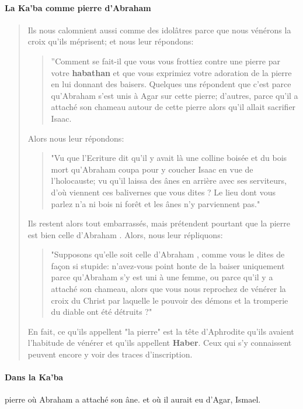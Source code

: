 \paragraph{La Ka'ba comme pierre d'Abraham}
\begin{quote}
    
Ils nous calomnient aussi comme des idolâtres parce que nous vénérons la croix qu'ils méprisent; et nous leur répondons: \begin{quote}
    ''Comment se fait-il que vous vous frottiez contre une pierre par votre \textbf{habathan} et que vous exprimiez votre adoration de la pierre en lui donnant des baisers. Quelques uns répondent que c'est parce qu'Abraham s'est unis à Agar sur cette pierre; d'autres, parce qu'il a attaché son chameau autour de cette pierre alors qu'il allait sacrifier Isaac.
\end{quote} Alors nous leur répondons: 
\begin{quote}
    "Vu que l'Ecriture dit qu'il y avait là une colline boisée et du bois mort qu'Abraham coupa pour y coucher Isaac en vue de l'holocauste; vu qu'il laissa des ânes en arrière avec ses serviteurs, d'où viennent ces balivernes que vous dites ? Le lieu dont vous parlez n'a ni bois ni forêt et les ânes n'y parviennent pas." 
\end{quote}

Ils restent alors tout embarrassés, mais prétendent pourtant que la pierre est bien celle d'Abraham . Alors, nous leur répliquons: \begin{quote}
    "Supposons qu'elle soit celle d'Abraham , comme vous le dites de façon si stupide: n'avez-vous point honte de la baiser uniquement parce qu'Abraham s'y est uni à une femme, ou parce qu'il y a attaché son chameau, alors que vous nous reprochez de vénérer la croix du Christ par laquelle le pouvoir des démons et la tromperie du diable ont été détruits ?"
\end{quote} 

En fait, ce qu'ils appellent "la pierre" est la tête d'Aphrodite qu'ils avaient l'habitude de
vénérer et qu'ils appellent \textbf{Haber}. Ceux qui s'y connaissent peuvent encore y voir des traces d'inscription.
\end{quote}

\paragraph{Dans la Ka'ba} pierre où Abraham a attaché son âne. et où il aurait eu d'Agar, Ismael.

